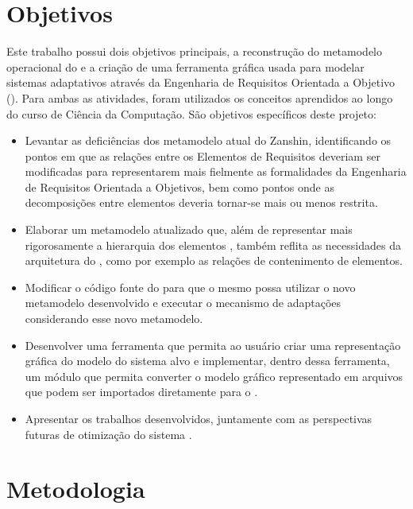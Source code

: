 \section{Objetivos}
\label{sec-intro-objetivos}

Este trabalho possui dois objetivos principais, a reconstrução do metamodelo operacional do \zanshin e a criação de uma ferramenta gráfica usada para modelar sistemas adaptativos através da Engenharia de Requisitos Orientada a Objetivo (\gore). Para ambas as atividades, foram utilizados os conceitos aprendidos ao longo do curso de Ciência da Computação. São objetivos específicos deste projeto:

\begin{itemize}
	
	\item Levantar as deficiências dos metamodelo atual do Zanshin, identificando os pontos em que as relações entre os Elementos de Requisitos deveriam ser modificadas para representarem mais fielmente as formalidades da Engenharia de Requisitos Orientada a Objetivos, bem como pontos onde as decomposições entre elementos deveria tornar-se mais ou menos restrita. 
	
	\item Elaborar um metamodelo atualizado que, além de representar mais rigorosamente a hierarquia dos elementos \gore, também reflita as necessidades da arquitetura do \zanshin, como por exemplo as relações de contenimento de elementos.
	
	\item Modificar o código fonte do \zanshin para que o mesmo possa utilizar o novo metamodelo desenvolvido e executar o mecanismo de adaptações considerando esse novo metamodelo.
	
	\item Desenvolver uma ferramenta que permita ao usuário criar uma representação gráfica do modelo do sistema alvo e implementar, dentro dessa ferramenta, um módulo que permita converter o modelo gráfico representado em arquivos \xml que podem ser importados diretamente para o \zanshin.
	
	\item Apresentar os trabalhos desenvolvidos, juntamente com as perspectivas futuras de otimização do sistema \zanshin.

\end{itemize}


\section{Metodologia}
\label{sec-intro-metodologia}

